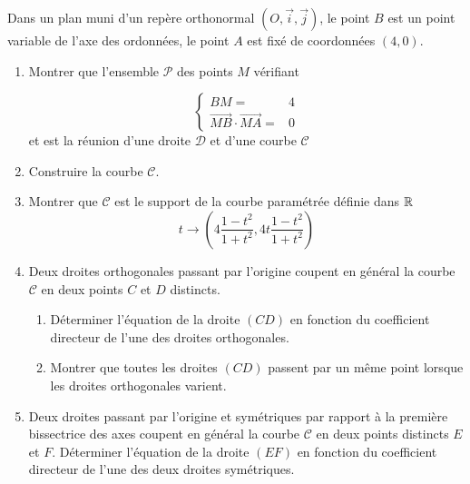 Dans un plan muni d'un rep{\`e}re orthonormal $(O,\overrightarrow{i},\overrightarrow{j})$, le point $B$ est un
point variable de l'axe des ordonn{\'e}es, le point $A$ est fix{\'e} de coordonn{\'e}es $(4,0)$.

\begin{enumerate}
\item Montrer que l'ensemble $\mathcal{P}$ des points $M$ v{\'e}rifiant

\begin{displaymath}
 \left\lbrace 
\begin{aligned}
 BM =& 4 \\
\overrightarrow{MB}\cdot\overrightarrow{MA} =& 0
\end{aligned}
\right. 
\end{displaymath}
et est la r{\'e}union d'une droite $\mathcal{D}$ et d'une courbe $\mathcal{C}$

\item Construire la courbe $\mathcal{C}$.

\item Montrer que $\mathcal{C}$ est le support de la courbe param{\'e}tr{\'e}e d{\'e}finie dans $\mathbb{R}$
\[t\rightarrow (4\frac{1-t^2}{1+t^2},4t\frac{1-t^2}{1+t^2})\]

\item  Deux droites orthogonales passant par l'origine coupent en g{\'e}n{\'e}ral la courbe $\mathcal{C}$ en deux points $C$ et $D$ distincts.
\begin{enumerate}
\item D{\'e}terminer l'{\'e}quation de la droite $(CD)$ en fonction du coefficient directeur de l'une des droites
orthogonales.

\item Montrer que toutes les droites $(CD)$ passent par un m{\^e}me point lorsque les droites orthogonales
varient.
\end{enumerate}
\item  Deux droites passant par l'origine et sym{\'e}triques par rapport {\`a} la premi{\`e}re bissectrice des axes coupent en g{\'e}n{\'e}ral la courbe $\mathcal{C}$ en deux points distincts $E$ et $F$. \newline
D{\'e}terminer l'{\'e}quation de la droite $(EF)$ en fonction du coefficient directeur de l'une des deux droites sym{\'e}triques.

\end{enumerate}
